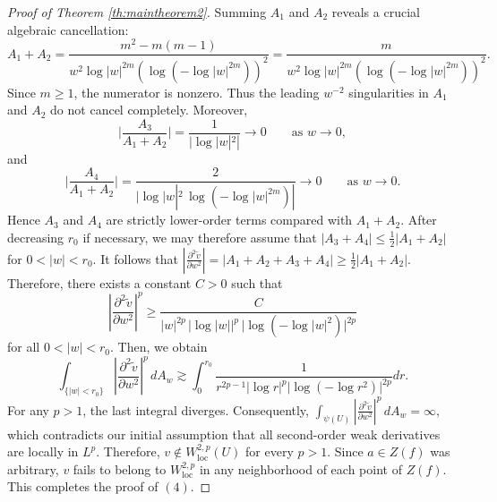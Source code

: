 \documentclass[12pt,twoside]{amsart}
\numberwithin{equation}{section}
\numberwithin{definition}{section} %
\begin{document}
\begin{proof}[Proof of Theorem \ref{th:maintheorem2}]
Summing $A_1$ and $A_2$ reveals a crucial algebraic cancellation:
\[
A_1+A_2
=
\frac{m^2-m(m-1)}
{w^2\log |w|^{2m}
\left(\log\left(-\log |w|^{2m}\right)\right)^2}
=
\frac{m}
{w^2\log |w|^{2m}
\left(\log\left(-\log |w|^{2m}\right)\right)^2}.
\]
Since \(m\geq 1\), the numerator is nonzero. Thus the leading \(w^{-2}\) singularities in \(A_1\) and \(A_2\) do not cancel completely. Moreover,
\[
\bigg|\frac{A_3}{A_1+A_2}\bigg|
=
\frac{1}{|\log |w|^2|}
\longrightarrow 0
\qquad \text{as } w\to 0,
\]
and
\[
\bigg|\frac{A_4}{A_1+A_2}\bigg|
=
\frac{2}
{|\log |w|^2\,
\log(-\log |w|^{2m})|}
\longrightarrow 0
\qquad \text{as } w\to 0.
\]
Hence \(A_3\) and \(A_4\) are strictly lower-order terms compared with
\(A_1+A_2\). After decreasing \(r_0\) if necessary, we may therefore assume that
$
|A_3+A_4|
\leq
\frac{1}{2}|A_1+A_2|$
for $ 0<|w|<r_0.
$
It follows that
$
\left|
\frac{\partial^2 \widetilde v}{\partial w^2}
\right|
=
|A_1+A_2+A_3+A_4|
\geq
\frac{1}{2}|A_1+A_2|.
$
Therefore, there exists a constant \(C>0\) such that
\[
\left|
\frac{\partial^2 \widetilde v}{\partial w^2}
\right|^p
\geq
\frac{C}
{|w|^{2p}\,|\log |w||^p\,
\bigl|\log(-\log |w|^2)\bigr|^{2p}}
\]
for all \(0<|w|<r_0\).
Then, we obtain
\[
\int_{\{|w|<r_0\}}
\left|
\frac{\partial^2 \widetilde{v}}{\partial w^2}
\right|^p
\,dA_w
\gtrsim
\int_0^{r_0}
\frac{1}
{r^{2p-1}|\log r|^p
\bigl|\log(-\log r^2)\bigr|^{2p}}dr.
\]
For any $p>1$, the last integral diverges. Consequently,
$
\int_{\psi(U)}
\left|
\frac{\partial^2 \widetilde{v}}{\partial w^2}
\right|^p
\,dA_w
=
\infty,
$
which contradicts  our initial assumption that all  second-order weak derivatives are locally in $L^p$.
Therefore,
$
v\notin W^{2,p}_{\mathrm{loc}}(U)$ for every $ p>1.$ Since \(a\in Z(f)\) was arbitrary, \(v\) fails to belong to \(W^{2,p}_{\mathrm{loc}}\) in any neighborhood of each point of \(Z(f)\). This completes the proof of \((4)\).






\end{proof}
\end{document}
